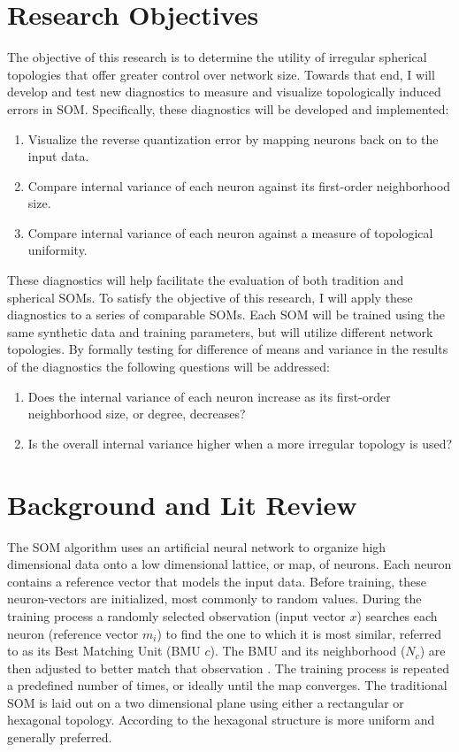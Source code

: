 \documentclass[10pt,titlepage]{article}
\begin{document}
\section{Research Objectives}
The objective of this research is to determine the utility of irregular
spherical topologies that offer greater control over network size. Towards that
end, I will develop and test new diagnostics to measure and visualize
topologically induced errors in SOM. Specifically, these diagnostics
will be developed and implemented:

\begin{enumerate}
	\item Visualize the reverse quantization error by mapping neurons back on to the input data.
    	\item Compare internal variance of each neuron against its first-order neighborhood size.
	\item Compare internal variance of each neuron against a measure of topological uniformity.
\end{enumerate}

These diagnostics will help facilitate the evaluation of both tradition and
spherical SOMs.  To satisfy the objective of this research, I will apply these
diagnostics to a series of comparable SOMs.  Each SOM will be trained using the
same synthetic data and training parameters, but will utilize different network
topologies.  By formally testing for difference of means and variance in the
results of the diagnostics the following questions will be addressed:

\begin{enumerate}
	\item Does the internal variance of each neuron increase as its first-order neighborhood size, or degree, decreases?
	\item Is the overall internal variance higher when a more irregular topology is used?
\end{enumerate}

\section{Background and Lit Review}

The SOM algorithm uses an artificial neural network to organize high dimensional
data onto a low dimensional lattice, or map, of neurons.  Each neuron contains a
reference vector that models the input data.  Before training, these
neuron-vectors are initialized, most commonly to random values.  During the
training process a randomly selected observation (input vector $x$) searches
each neuron (reference vector $m_i$) to find the one to which it is most
similar, referred to as its Best Matching Unit (BMU $c$).  The BMU and its
neighborhood ($N_c$) are then adjusted to better match that observation
\citep{Kohonen2000}.  The training process is repeated a predefined number of
times, or ideally until the map converges.  The traditional SOM is laid out on a
two dimensional plane using either a rectangular or hexagonal topology.
According to \cite{wu2006} the hexagonal structure is more uniform and generally
preferred.
\end{document}
